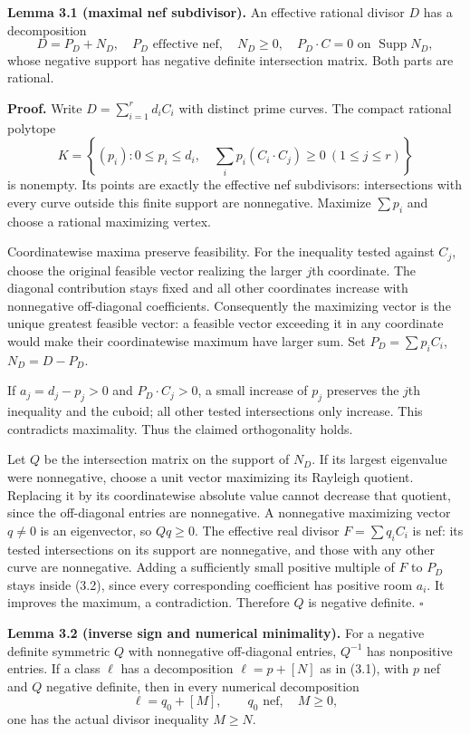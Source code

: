 \documentclass[
  10pt,
]{article}
\begin{document}
\textbf{Lemma 3.1 (maximal nef subdivisor).} An effective rational
divisor \(D\) has a decomposition \[
 D=P_D+N_D,
 \quad P_D\text{ effective nef},\quad N_D\geq0,\quad
 P_D\cdot C=0\text{ on }\operatorname{Supp}N_D,
                                                               \tag{3.1}
\] whose negative support has negative definite intersection matrix.
Both parts are rational.

\textbf{Proof.} Write \(D=\sum_{i=1}^r d_iC_i\) with distinct prime
curves. The compact rational polytope \[
 K=\left\{(p_i):0\leq p_i\leq d_i,\quad
                  \sum_i p_i(C_i\cdot C_j)\geq0\ (1\leq j\leq r)
      \right\}                                                \tag{3.2}
\] is nonempty. Its points are exactly the effective nef subdivisors:
intersections with every curve outside this finite support are
nonnegative. Maximize \(\sum p_i\) and choose a rational maximizing
vertex.

Coordinatewise maxima preserve feasibility. For the inequality tested
against \(C_j\), choose the original feasible vector realizing the
larger \(j\)th coordinate. The diagonal contribution stays fixed and all
other coordinates increase with nonnegative off-diagonal coefficients.
Consequently the maximizing vector is the unique greatest feasible
vector: a feasible vector exceeding it in any coordinate would make
their coordinatewise maximum have larger sum. Set \(P_D=\sum p_iC_i\),
\(N_D=D-P_D\).

If \(a_j=d_j-p_j>0\) and \(P_D\cdot C_j>0\), a small increase of \(p_j\)
preserves the \(j\)th inequality and the cuboid; all other tested
intersections only increase. This contradicts maximality. Thus the
claimed orthogonality holds.

Let \(Q\) be the intersection matrix on the support of \(N_D\). If its
largest eigenvalue were nonnegative, choose a unit vector maximizing its
Rayleigh quotient. Replacing it by its coordinatewise absolute value
cannot decrease that quotient, since the off-diagonal entries are
nonnegative. A nonnegative maximizing vector \(q\ne0\) is an
eigenvector, so \(Qq\geq0\). The effective real divisor
\(F=\sum q_iC_i\) is nef: its tested intersections on its support are
nonnegative, and those with any other curve are nonnegative. Adding a
sufficiently small positive multiple of \(F\) to \(P_D\) stays inside
(3.2), since every corresponding coefficient has positive room \(a_i\).
It improves the maximum, a contradiction. Therefore \(Q\) is negative
definite. \(\square\)

\textbf{Lemma 3.2 (inverse sign and numerical minimality).} For a
negative definite symmetric \(Q\) with nonnegative off-diagonal entries,
\(Q^{-1}\) has nonpositive entries. If a class \(\ell\) has a
decomposition \(\ell=p+[N]\) as in (3.1), with \(p\) nef and \(Q\)
negative definite, then in every numerical decomposition \[
 \ell=q_0+[M],\qquad q_0\text{ nef},\quad M\geq0,
                                                               \tag{3.3}
\] one has the actual divisor inequality \(M\geq N\).
\end{document}
